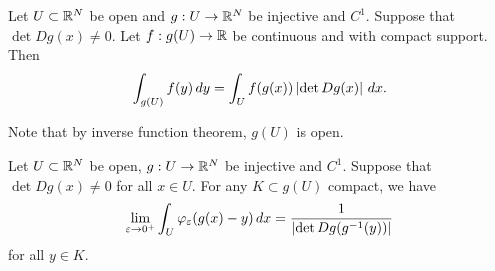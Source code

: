 \documentclass[a4paper]{article}
\begin{document}
\begin{thm}

  Let $U \subset \mathbb{R}^N$ be open and $g : U \to \mathbb{R}^N$ be injective and
  $C^1$. Suppose that $\det Dg (x) \neq 0$. Let $f : g(U) \to \mathbb{R}$ be
  continuous and with compact support. Then
  \[
    \int_{g(U)}  f(y) \, d y = \int_U f(g(x)) \left\lvert \det Dg(x)\right\rvert \, d x.
  \]
\end{thm}

\begin{remark}
  Note that by inverse function theorem, $g(U)$ is open.
\end{remark}

\begin{lemma}

  Let $U \subset \mathbb{R}^N$ be open, $g : U \to \mathbb{R}^N$ be injective and $C^1$.
  Suppose that $\det Dg(x) \neq 0$ for all $x \in U$. For any $K \subset
  g(U)$ compact, we have
  \[
    \lim_{\varepsilon \to 0^+} \int_U \varphi_\varepsilon (g(x) - y) \, d x
    = \frac{1}{\left\lvert \det Dg (g^{-1} (y))\right\rvert}
  \]
  for all $y \in K$.
\end{lemma}
\end{document}

